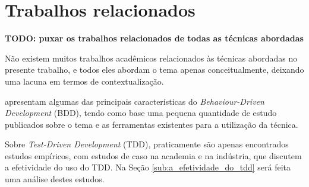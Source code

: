 \section{Trabalhos relacionados} %
\label{sec:trabalhos_relacionados}

\textbf{TODO: puxar os trabalhos relacionados de todas as técnicas abordadas}

Não existem muitos trabalhos acadêmicos relacionados às técnicas abordadas no presente trabalho, e todos eles abordam o tema apenas conceitualmente, deixando uma lacuna em termos de contextualização.

 apresentam algumas das principais características do \textit{Behaviour-Driven Development} (BDD), tendo como base uma pequena quantidade de estudo publicados sobre o tema e as ferramentas existentes para a utilização da técnica.

Sobre \textit{Test-Driven Development} (TDD), praticamente são apenas encontrados estudos empíricos, com estudos de caso na academia e na indústria, que discutem a efetividade do uso do TDD. Na Seção \ref{sub:a_efetividade_do_tdd} será feita uma análise destes estudos.

